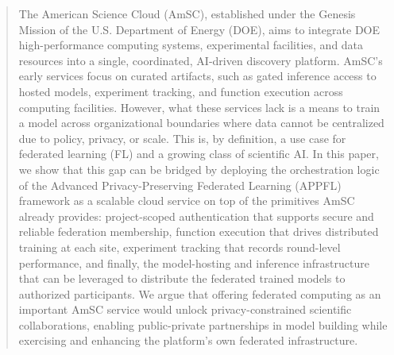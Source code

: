 \documentclass[conference]{IEEEtran}
\begin{document}
\begin{abstract}
The American Science Cloud (AmSC), established under the Genesis Mission of the U.S. Department of Energy (DOE), aims to integrate DOE high-performance computing systems, experimental facilities, and data resources into a single, coordinated, AI-driven discovery platform. AmSC's early services focus on curated artifacts, such as gated inference access to hosted models, experiment tracking, and function execution across computing facilities. However, what these services lack is a means to train a model across organizational boundaries where data cannot be centralized due to policy, privacy, or scale. This is, by definition,  a use case for federated learning (FL) and a growing class of scientific AI. In this paper, we show that this gap can be bridged by deploying the orchestration logic of the Advanced Privacy-Preserving Federated Learning (APPFL) framework as a scalable cloud service on top of the primitives AmSC already provides: project-scoped authentication that supports secure and reliable federation membership, function execution that drives distributed training at each site, experiment tracking that records round-level performance, and finally, the model-hosting and inference infrastructure that can be leveraged to distribute the federated trained models to authorized participants. We argue that offering federated computing as an important AmSC service would unlock privacy-constrained scientific collaborations, enabling public-private partnerships in model building  while exercising and enhancing the platform's own federated infrastructure. 
\end{abstract}
\end{document}
